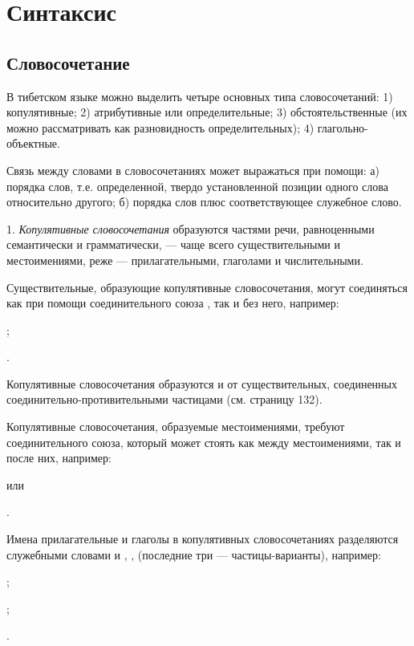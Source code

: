 \chapter{Синтаксис}

\section{Словосочетание}

В тибетском языке можно выделить четыре основных типа словосочетаний: 1) копулятивные; 2) атрибутивные или определительные; 3) обстоятельственные (их можно рассматривать как разновидность определительных); 4) глагольно-объектные.

Связь между словами в словосочетаниях может выражаться при помощи: а) порядка слов, т.е. определенной, твердо установленной позиции одного слова относительно другого; б) порядка слов плюс соответствующее служебное слово.

1. \emph{Копулятивные словосочетания} образуются частями речи, равноценными семантически и грамматически, --- чаще всего существительными и местоимениями, реже --- прилагательными, глаголами и числительными.

Существительные, образующие копулятивные словосочетания, могут соединяться как при помощи соединительного союза , так и без него, например:
\begin{prfsample}
	\item {};
	\item {}.
\end{prfsample}
Копулятивные словосочетания образуются и от существительных, соединенных соединительно-противительными частицами (см. страницу 132).

Копулятивные словосочетания, образуемые местоимениями, требуют соединительного союза, который может стоять как между местоимениями, так и после них, например:
\begin{prfsample}
	\item {} или
	\item {}.
\end{prfsample}

Имена прилагательные и глаголы в копулятивных словосочетаниях разделяются служебными словами  и , ,  (последние три --- частицы-варианты), например:
\begin{prfsample}
	\item {};
	\item {};
	\item {}.
\end{prfsample}

